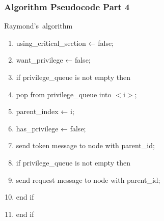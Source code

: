 \documentclass[11pt]{beamer}              %
\begin{document}
\begin{frame}
\frametitle{Algorithm Pseudocode Part 4}

\begin{center}
\begin{algorithm}[H]
	\scriptsize
	\def\algorithmlabel{Raymond's}
    \caption{\algorithmlabel\ algorithm}
    \label{alg:raymondsalgorithm}
    \begin{algorithmic}[1]
            \begin{enumerate}
                \item using\_critical\_section ← false;
                \item want\_privilege ← false;
                \item if privilege\_queue is not empty then
                \item \quad pop from privilege\_queue into $<$i$>$;
                \item \quad parent\_index ← i;
                \item \quad has\_privilege ← false;
                \item \quad send token message to node with parent\_id;
                \item \quad if privilege\_queue is not empty then
                \item \quad \quad send request message to node with parent\_id;
                \item \quad end if
                \item end if
            \end{enumerate}
    \end{algorithmic}
\end{algorithm}
\end{center}
\end{frame}
\end{document}
